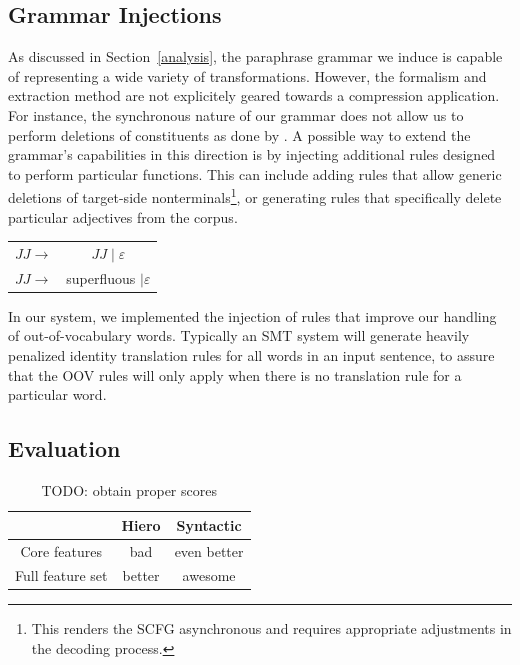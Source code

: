 \documentclass[11pt]{article}
\begin{document}
\subsection{Grammar Injections} \label{injection}

As discussed in Section~\ref{analysis}, the paraphrase grammar we
induce is capable of representing a wide variety of
transformations. However, the formalism and extraction method are not
explicitely geared towards a compression application. For instance,
the synchronous nature of our grammar does not allow us to perform
deletions of constituents as done by .  A possible
way to extend the grammar's capabilities in this direction is by
injecting additional rules designed to perform particular
functions. This can include adding rules that allow generic deletions
of target-side nonterminals\footnote{This renders the SCFG
  asynchronous and requires appropriate adjustments in the decoding
  process.}, or generating rules that specifically delete particular
adjectives from the corpus.
\begin{center}
\begin{tabular}{cc}
 $\mathit{JJ} \rightarrow$ & $\mathit{JJ} \mid \varepsilon$ \\
 $\mathit{JJ} \rightarrow$ & superfluous $\mid \varepsilon$ \\
\end{tabular}
\end{center}
In our system, we implemented the injection of rules that improve our
handling of out-of-vocabulary words. Typically an SMT system will
generate heavily penalized identity translation rules for all words in
an input sentence, to assure that the OOV rules will only apply when
there is no translation rule for a particular word.


\subsection{Evaluation} \label{evaluation}

\begin{table}
\begin{center}
\begin{tabular}{|c|c|c|}
  \hline
  & Hiero & Syntactic \\
  \hline
  Core features & bad & even better \\
  Full feature set & better & awesome \\
  \hline
\end{tabular}
\end{center}
\caption{TODO: obtain proper scores}
\end{table}
\end{document}
